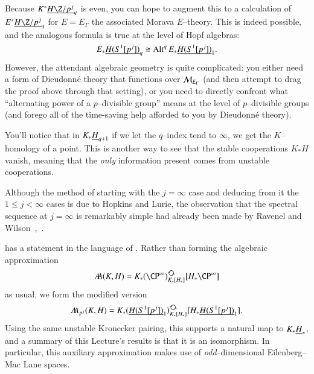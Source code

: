 \begin{remark}\label{EThyOfEMSpaces}
Because $K^* \OS{H\Z/p^j}{q}$ is even, you can hope to augment this to a calculation of $E^* \OS{H\Z/p^j}{q}$ for $E = E_\Gamma$ the associated Morava $E$--theory.  This is indeed possible, and the analogous formula is true at the level of Hopf algebras: \[E_* \underline{\smash{H(S^1[p^j])}}_{q} \cong \operatorname{Alt}^q E_* \underline{\smash{H(S^1[p^j])}}_{1}.\] However, the attendant algebraic geometry is quite complicated: you either need a form of Dieudonn\'e theory that functions over $\mathcal{M}_{E_\Gamma}$ (and then attempt to drag the proof above through that setting), or you need to directly confront what ``alternating power of a $p$--divisible group'' means at the level of $p$--divisible groups (and forego all of the time-saving help afforded to you by Dieudonn\'e theory).
\end{remark}

\begin{remark}
You'll notice that in $K_* \underline{\smash{H}}_{q+1}$ if we let the $q$--index tend to $\infty$, we get the $K$--homology of a point.  This is another way to see that the stable cooperations $K_* H$ vanish, meaning that the \emph{only} information present comes from unstable cooperations.
\end{remark}

\begin{remark}
Although the method of starting with the $j = \infty$ case and deducing from it the $1 \le j < \infty$ cases is due to Hopkins and Lurie, the observation that the spectral sequence at $j = \infty$ is remarkably simple had already been made by Ravenel and Wilson~\cite[Theorem 12.3]{RavenelWilsonKthyOfEMSpaces},~\cite[Theorem 8.1.3]{RWY}.
\end{remark}

\begin{remark}
 has a statement in the language of .  Rather than forming the algebraic approximation \[\AA(K, H) = K_*(\CP^\infty)_{K_*[H_*]}^{\circulatearrows}[H_* \CP^\infty]\] as usual, we form the modified version \[\AA_{p^j}(K, H) = K_*(\OS{H(S^1[p^j])}{1})_{K_*[H_*]}^{\circulatearrows}[H_* \OS{H(S^1[p^j])}{1}].\]  Using the same unstable Kronecker pairing, this supports a natural map to $K_* \underline{\smash{H}}_{*}$, and a summary of this Lecture's results is that it is an isomorphism.  In particular, this auxiliary approximation makes use of \emph{odd}--dimensional Eilenberg--Mac Lane spaces.
\end{remark}











